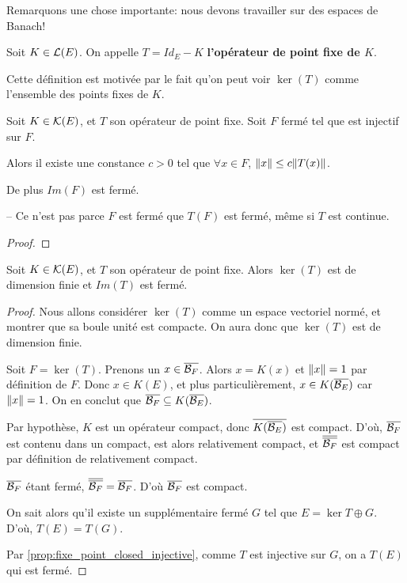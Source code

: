 Remarquons une chose importante: nous devons travailler sur des espaces de
Banach!


\begin{definition} 
	Soit $K \in \mathcal{L}(E)$. On appelle $T = Id_{E} - K$
	\textbf{l'opérateur de point fixe de $K$}.
	
	Cette définition est motivée par le fait qu'on peut voir $\ker(T)$ comme
	l'ensemble des points fixes de $K$.
\end{definition}

\begin{proposition}
	\label{prop:fixe_point_closed_injective}
	Soit $K \in \mathcal{K}(E)$, et $T$ son opérateur de point fixe. Soit $F$
	fermé tel que  est injectif sur $F$.

	Alors il existe une constance $c > 0$ tel que $\forall x \in F$, $\norm{x}
	\leq c \norm{T(x)}$.

	De plus $Im(F)$ est fermé.
\end{proposition}

\begin{remarque}
	-- Ce n'est pas parce $F$ est fermé que $T(F)$ est fermé, même si $T$ est
	continue.
\end{remarque}

\begin{proof}
\end{proof}

\begin{proposition}
	Soit $K \in \mathcal{K}(E)$, et $T$ son opérateur de point fixe. Alors
	$\ker(T)$ est de dimension finie et $Im(T)$ est fermé.
\end{proposition}

\begin{proof}
	Nous allons considérer $\ker(T)$ comme un espace vectoriel normé, et montrer
	que sa boule unité est compacte. On aura donc que $\ker(T)$ est de
	dimension finie.

	Soit $F = \ker(T)$.
	Prenons un $x \in \overline{\mathcal{B}_{F}}$. Alors $x = K(x)$ et $\norm{x} = 1$
	par définition de $F$.
	Donc $x \in K(E)$, et plus particulièrement, $x \in
	K(\overline{\mathcal{B}_{E}})$ car $\norm{x} = 1$.
	On en conclut que $\overline{\mathcal{B}_{F}} \subseteq
	K(\overline{\mathcal{B}_{E}})$.

	Par hypothèse, $K$ est un opérateur compact, donc
	$\overline{K(\overline{\mathcal{B}_{E}})}$ est compact. D'où, $\overline{\mathcal{B}_{F}}$
	est contenu dans un compact, est alors relativement compact, et
	$\overline{\overline{\mathcal{B}_{F}}}$ est compact par définition de relativement
	compact.

	$\overline{\mathcal{B}_{F}}$ étant fermé, $\overline{\overline{\mathcal{B}_{F}}} =
	\overline{\mathcal{B}_{F}}$. D'où $\overline{\mathcal{B}_{F}}$ est compact.

	On sait alors qu'il existe un supplémentaire fermé $G$ tel que $E = \ker{T}
	\oplus G$. D'où, $T(E) = T(G)$.

	Par \ref{prop:fixe_point_closed_injective}, comme $T$ est injective sur $G$,
	on a $T(E)$ qui est fermé.
\end{proof}

